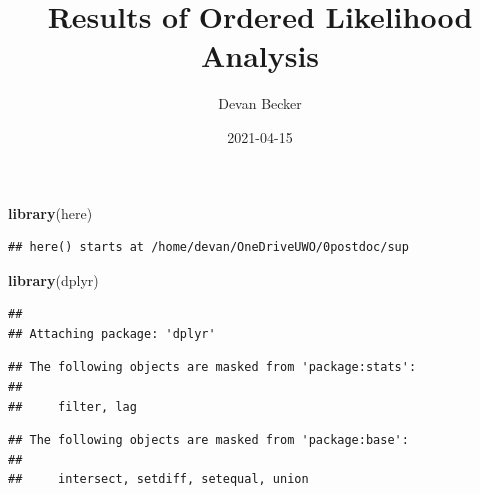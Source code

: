 \documentclass[
]{article}
\title{Results of Ordered Likelihood Analysis}
\author{Devan Becker}
\date{2021-04-15}
\newenvironment{Shaded}{\begin{snugshade}}{\end{snugshade}}
\newcommand{\KeywordTok}[1]{\textcolor[rgb]{0.13,0.29,0.53}{\textbf{#1}}}
\newcommand{\NormalTok}[1]{#1}
\begin{document}
\maketitle

\begin{Shaded}
\begin{Highlighting}[]
\KeywordTok{library}\NormalTok{(here)}
\end{Highlighting}
\end{Shaded}

\begin{verbatim}
## here() starts at /home/devan/OneDriveUWO/0postdoc/sup
\end{verbatim}

\begin{Shaded}
\begin{Highlighting}[]
\KeywordTok{library}\NormalTok{(dplyr)}
\end{Highlighting}
\end{Shaded}

\begin{verbatim}
## 
## Attaching package: 'dplyr'
\end{verbatim}

\begin{verbatim}
## The following objects are masked from 'package:stats':
## 
##     filter, lag
\end{verbatim}

\begin{verbatim}
## The following objects are masked from 'package:base':
## 
##     intersect, setdiff, setequal, union
\end{verbatim}
\end{document}
